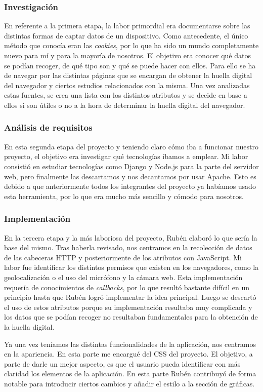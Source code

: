 \subsubsection{Investigación}
En referente a la primera etapa, la labor primordial era documentarse sobre las distintas formas de captar datos de un dispositivo. Como antecedente, el único método que conocía eran las \textit{cookies}, por lo que ha sido un mundo completamente nuevo para mí y para la mayoría de nosotros. El objetivo era conocer qué datos se podían recoger, de qué tipo son y qué se puede hacer con ellos. Para ello se ha de navegar por las distintas páginas que se encargan de obtener la huella digital del navegador y ciertos estudios relacionados con la misma. Una vez analizadas estas fuentes, se crea una lista con los distintos atributos y se decide en base a ellos si son útiles o no a la hora de determinar la huella digital del navegador.
\subsubsection{Análisis de requisitos}
En esta segunda etapa del proyecto y teniendo claro cómo iba a funcionar nuestro proyecto, el objetivo era investigar qué tecnologías íbamos a emplear. Mi labor consistió en estudiar tecnologías como Django y Node.js para la parte del servidor web, pero finalmente las descartamos y nos decantamos por usar Apache. Esto es debido a que anteriormente todos los integrantes del proyecto ya habíamos usado esta herramienta, por lo que era mucho más sencillo y cómodo para nosotros.
\subsubsection{Implementación}
En la tercera etapa y la más laboriosa del proyecto, Rubén elaboró lo que sería la base del mismo. Tras haberla revisado, nos centramos en la recolección de datos de las cabeceras HTTP y posteriormente de los atributos con JavaScript. Mi labor fue identificar los distintos permisos que existen en los navegadores, como la geolocalización o el uso del micrófono y la cámara web. Esta implementación requería de conocimientos de \textit{callbacks}, por lo que resultó bastante difícil en un principio hasta que Rubén logró implementar la idea principal. Luego se descartó el uso de estos atributos porque su implementación resultaba muy complicada y los datos que se podían recoger no resultaban fundamentales para la obtención de la huella digital.\par
Ya una vez teníamos las distintas funcionalidades de la aplicación, nos centramos en la apariencia. En esta parte me encargué del CSS del proyecto. El objetivo, a parte de darle un mejor aspecto, es que el usuario pueda identificar con más claridad los elementos de la aplicación. En esta parte Rubén contribuyó de forma notable para introducir ciertos cambios y añadir el estilo a la sección de gráficas. 
